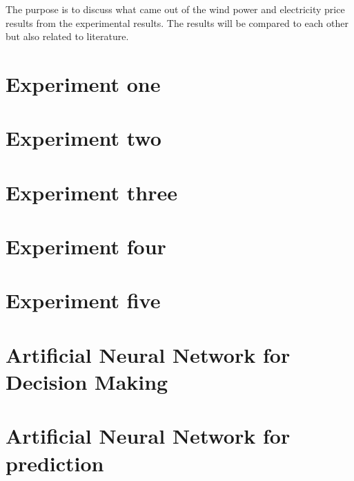 The purpose is to discuss what came out of the wind power and electricity price results from the experimental results. The results will be compared to each other but also related to literature.

\section{Experiment one}
\label{sec:inputParameterDiscussion}

\newpage

\section{Experiment two}
\label{sec:matrixTrimmingDiscussion}


\newpage
\section{Experiment three}
\label{sec:calculatedInputDiscussion}


\newpage
\section{Experiment four}
\label{sec:blackBoxDiscussion}


\newpage
\section{Experiment five}
\label{sec:stepAheadForecastingDiscussion}


\newpage
\section{Artificial Neural Network for Decision Making}
\label{sec:annForDecisionMaking}


\newpage
\section{Artificial Neural Network for prediction}
\label{sec:annForPrediction}


